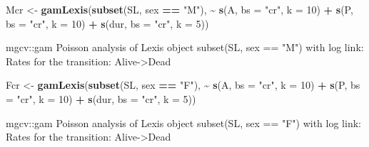 \documentclass[
]{book}
\newenvironment{Shaded}{\begin{snugshade}}{\end{snugshade}}
\newcommand{\AttributeTok}[1]{\textcolor[rgb]{0.13,0.29,0.53}{#1}}
\newcommand{\DecValTok}[1]{\textcolor[rgb]{0.00,0.00,0.81}{#1}}
\newcommand{\FunctionTok}[1]{\textcolor[rgb]{0.13,0.29,0.53}{\textbf{#1}}}
\newcommand{\NormalTok}[1]{#1}
\newcommand{\OtherTok}[1]{\textcolor[rgb]{0.56,0.35,0.01}{#1}}
\newcommand{\SpecialCharTok}[1]{\textcolor[rgb]{0.81,0.36,0.00}{\textbf{#1}}}
\newcommand{\StringTok}[1]{\textcolor[rgb]{0.31,0.60,0.02}{#1}}
\begin{document}
\begin{enumerate}
\begin{Shaded}
\begin{Highlighting}[]
\NormalTok{Mcr }\OtherTok{\textless{}{-}} \FunctionTok{gamLexis}\NormalTok{(}\FunctionTok{subset}\NormalTok{(SL, sex }\SpecialCharTok{==} \StringTok{"M"}\NormalTok{),}
                 \SpecialCharTok{\textasciitilde{}} \FunctionTok{s}\NormalTok{(A, }\AttributeTok{bs =} \StringTok{"cr"}\NormalTok{, }\AttributeTok{k =} \DecValTok{10}\NormalTok{) }\SpecialCharTok{+}
                   \FunctionTok{s}\NormalTok{(P, }\AttributeTok{bs =} \StringTok{"cr"}\NormalTok{, }\AttributeTok{k =} \DecValTok{10}\NormalTok{) }\SpecialCharTok{+}
                 \FunctionTok{s}\NormalTok{(dur, }\AttributeTok{bs =} \StringTok{"cr"}\NormalTok{, }\AttributeTok{k =} \DecValTok{5}\NormalTok{))}
\end{Highlighting}
\end{Shaded}

\begin{Shaded}
\begin{Highlighting}[]
\NormalTok{mgcv::gam Poisson analysis of Lexis object subset(SL, sex == "M") with log link:}
\NormalTok{Rates for the transition:}
\NormalTok{Alive{-}\textgreater{}Dead}
\end{Highlighting}
\end{Shaded}

\begin{Shaded}
\begin{Highlighting}[]
\NormalTok{Fcr }\OtherTok{\textless{}{-}} \FunctionTok{gamLexis}\NormalTok{(}\FunctionTok{subset}\NormalTok{(SL, sex }\SpecialCharTok{==} \StringTok{"F"}\NormalTok{),}
                 \SpecialCharTok{\textasciitilde{}} \FunctionTok{s}\NormalTok{(A, }\AttributeTok{bs =} \StringTok{"cr"}\NormalTok{, }\AttributeTok{k =} \DecValTok{10}\NormalTok{) }\SpecialCharTok{+}
                   \FunctionTok{s}\NormalTok{(P, }\AttributeTok{bs =} \StringTok{"cr"}\NormalTok{, }\AttributeTok{k =} \DecValTok{10}\NormalTok{) }\SpecialCharTok{+}
                 \FunctionTok{s}\NormalTok{(dur, }\AttributeTok{bs =} \StringTok{"cr"}\NormalTok{, }\AttributeTok{k =} \DecValTok{5}\NormalTok{))}
\end{Highlighting}
\end{Shaded}

\begin{Shaded}
\begin{Highlighting}[]
\NormalTok{mgcv::gam Poisson analysis of Lexis object subset(SL, sex == "F") with log link:}
\NormalTok{Rates for the transition:}
\NormalTok{Alive{-}\textgreater{}Dead}
\end{Highlighting}
\end{Shaded}


\end{enumerate}
\end{document}
